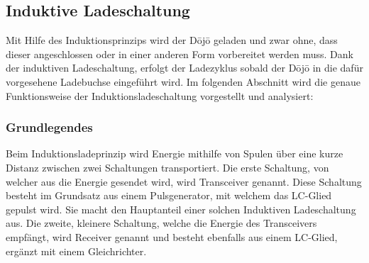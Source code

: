 \subsection{Induktive Ladeschaltung}\label{sec:energieuebertragung}
Mit Hilfe des Induktionsprinzips wird der Dōjō geladen und zwar ohne, dass dieser angeschlossen oder in einer anderen Form vorbereitet werden muss. Dank der induktiven Ladeschaltung, erfolgt der Ladezyklus sobald der Dōjō in die dafür vorgesehene Ladebuchse eingeführt wird. Im folgenden Abschnitt wird die genaue Funktionsweise der Induktionsladeschaltung vorgestellt und analysiert:

\subsubsection*{Grundlegendes}
Beim Induktionsladeprinzip wird Energie mithilfe von Spulen über eine kurze Distanz zwischen zwei Schaltungen transportiert. Die erste Schaltung, von welcher aus die Energie gesendet wird, wird Transceiver genannt. Diese Schaltung besteht im Grundsatz aus einem Pulsgenerator, mit welchem das LC-Glied gepulst wird. Sie macht den Hauptanteil einer solchen Induktiven Ladeschaltung aus. Die zweite, kleinere Schaltung, welche die Energie des Transceivers empfängt, wird Receiver genannt und besteht ebenfalls aus einem LC-Glied, ergänzt mit einem Gleichrichter.

